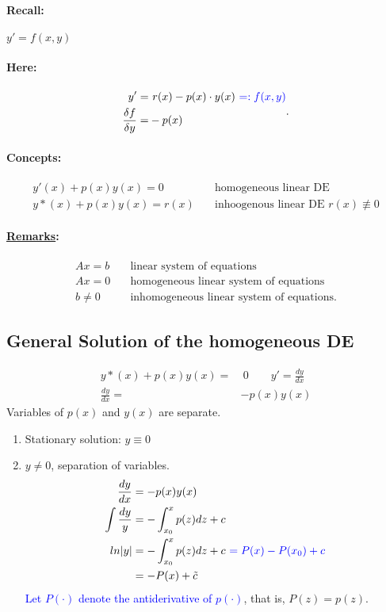 \documentclass[]{article}
\begin{document}
		\paragraph{Recall:} $y'=f(x,y)$
		\paragraph{Here:} \[
		\begin{split}
			y'= &~ r(x)-p(x) \cdot y(x) \text{ \textcolor{blue}{$=:f(x,y)$}} \\
			\frac{\delta f}{\delta y} = & -p(x)
		\end{split}
		.\]
		\paragraph{Concepts:} 
		\[
		\begin{split}
			y'(x)+p(x)y(x) = 0\quad & \text{homogeneous linear DE} \\
			y*(x)+p(x)y(x)=r(x)\quad & \text{inhoogenous linear DE }r(x)\not\equiv0
		\end{split}
		\]
		\paragraph{ \underline{Remarks}:}
		\[
			\begin{split}
				Ax = b \quad & \text{linear system of equations} \\
				Ax=0\quad & \text{homogeneous linear system of equations} \\
				b\not=0\quad & \text{inhomogeneous linear system of equations.}
			\end{split}
		\]
		\subsection{General Solution of the homogeneous DE}
		\[
		\begin{split}
			y*(x) + p(x)y(x)= & ~0\quad\quad y'= \frac{dy}{dx}  \\
			\frac{dy}{dx}= &-p(x)y(x) 
		\end{split}
		\]
		Variables of $p(x)$ and $y(x)$ are separate.
		\begin{enumerate}
			\item Stationary solution: $y\equiv 0$
			\item $y\not=0$, separation of variables.
				\[
				\begin{split}
				\frac{dy}{dx} & =-p(x)y(x) \\
				\int \frac{dy}{y} &= - \int_{x_0}^{x} p(z) dz+c\\
				ln|y| &=- \int_{x_0}^{x} p(z) dz+c \text{ \textcolor{blue}{$=P(x)-P(x_0)+c$}}\\
				      &=-P(x)+\tilde c
				\end{split}
				\]
				\textcolor{blue}{Let $P( \cdot )$ denote the antiderivative of $p( \cdot )$}, that is, $P
				(z)=p(z)$.
		\end{enumerate}
\end{document}
